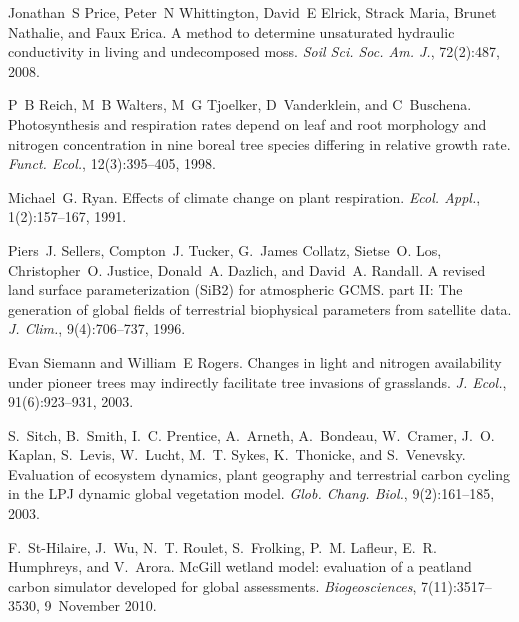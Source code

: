 \begin{DoxyDescription}
\item[\label{_CITEREF_Price2008-fr}%
\mbox{[}47\mbox{]}]Jonathan~S Price, Peter~N Whittington, David~E Elrick, Strack Maria, Brunet Nathalie, and Faux Erica. A method to determine unsaturated hydraulic conductivity in living and undecomposed moss. {\itshape Soil Sci. Soc. Am. J.}, 72(2)\+:487, 2008. 


\item[\label{_CITEREF_Reich1998-zr}%
\mbox{[}48\mbox{]}]P~B Reich, M~B Walters, M~G Tjoelker, D~Vanderklein, and C~Buschena. Photosynthesis and respiration rates depend on leaf and root morphology and nitrogen concentration in nine boreal tree species differing in relative growth rate. {\itshape Funct. Ecol.}, 12(3)\+:395--405, 1998. 


\item[\label{_CITEREF_Ryan1991-ai}%
\mbox{[}49\mbox{]}]Michael~G. Ryan. Effects of climate change on plant respiration. {\itshape Ecol. Appl.}, 1(2)\+:157--167, 1991. 


\item[\label{_CITEREF_Sellers1996-bh}%
\mbox{[}50\mbox{]}]Piers~J. Sellers, Compton~J. Tucker, G.~James Collatz, Sietse~O. Los, Christopher~O. Justice, Donald~A. Dazlich, and David~A. Randall. A revised land surface parameterization (Si\+B2) for atmospheric G\+C\+M\+S. part I\+I\+: The generation of global fields of terrestrial biophysical parameters from satellite data. {\itshape J. Clim.}, 9(4)\+:706--737, 1996. 


\item[\label{_CITEREF_Siemann2003-jl}%
\mbox{[}51\mbox{]}]Evan Siemann and William~E Rogers. Changes in light and nitrogen availability under pioneer trees may indirectly facilitate tree invasions of grasslands. {\itshape J. Ecol.}, 91(6)\+:923--931, 2003. 


\item[\label{_CITEREF_Sitch2003-847}%
\mbox{[}52\mbox{]}]S.~Sitch, B.~Smith, I.~C. Prentice, A.~Arneth, A.~Bondeau, W.~Cramer, J.~O. Kaplan, S.~Levis, W.~Lucht, M.~T. Sykes, K.~Thonicke, and S.~Venevsky. Evaluation of ecosystem dynamics, plant geography and terrestrial carbon cycling in the L\+P\+J dynamic global vegetation model. {\itshape Glob. Chang. Biol.}, 9(2)\+:161--185, 2003. 


\item[\label{_CITEREF_St-Hilaire2010-5e9}%
\mbox{[}53\mbox{]}]F.~St-\/\+Hilaire, J.~Wu, N.~T. Roulet, S.~Frolking, P.~M. Lafleur, E.~R. Humphreys, and V.~Arora. Mc\+Gill wetland model\+: evaluation of a peatland carbon simulator developed for global assessments. {\itshape Biogeosciences}, 7(11)\+:3517--3530, 9~November 2010. 



\end{DoxyDescription}
